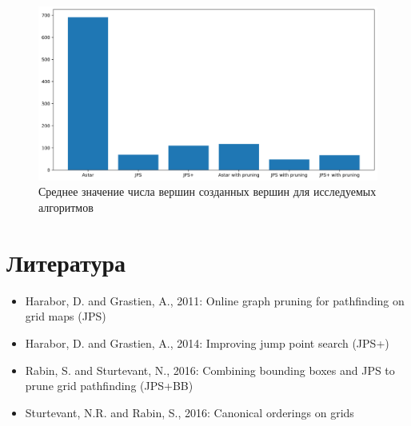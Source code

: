 \documentclass{physlab}
\begin{document}
\begin{figure}[H] 
\centering
    \includegraphics[width=0.55\linewidth]{1NodesCreated.png}
    \caption{Среднее значение числа вершин созданных вершин для исследуемых алгоритмов}
\end{figure}


\section{Литература}
\begin{itemize}
    \item Harabor, D. and Grastien, A., 2011: Online graph pruning for pathfinding on grid maps (JPS)
    \item Harabor, D. and Grastien, A., 2014: Improving jump point search (JPS+)
    \item Rabin, S. and Sturtevant, N., 2016: Combining bounding boxes and JPS to prune grid pathfinding (JPS+BB)
    \item Sturtevant, N.R. and Rabin, S., 2016: Canonical orderings on grids
\end{itemize}
    
\end{document}
